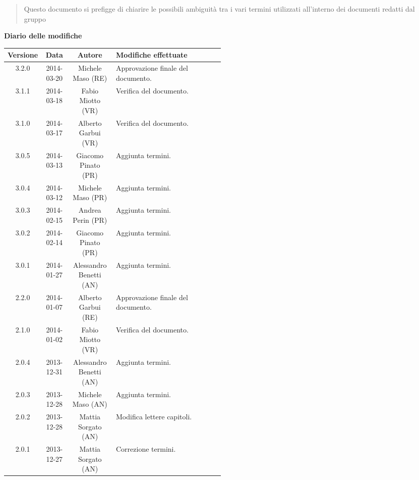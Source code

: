 \begin{abstract}
\begin{center}
Questo documento si prefigge di chiarire le possibili ambiguità tra i vari termini utilizzati all'interno dei documenti redatti dal gruppo \NomeGruppo{}
\end{center}
\end{abstract}

\newpage
\textbf{Diario delle modifiche}
\begin{center}
\begin{longtable}{|c|c|c|p{0.5\linewidth}|}
\toprule
\textbf{Versione} & \textbf{Data} & \textbf{Autore} & \textbf{Modifiche effettuate}\\

\midrule
3.2.0 & 2014-03-20 & Michele Maso (RE) & Approvazione finale del documento.\\
\midrule
3.1.1 & 2014-03-18 & Fabio Miotto (VR) & Verifica del documento. \\
\midrule
3.1.0 & 2014-03-17 & Alberto Garbui (VR) & Verifica del documento. \\
\midrule
3.0.5 & 2014-03-13 & Giacomo Pinato (PR) & Aggiunta termini.\\
\midrule
3.0.4 & 2014-03-12 & Michele Maso (PR) & Aggiunta termini.\\
\midrule
3.0.3 & 2014-02-15 & Andrea Perin (PR) & Aggiunta termini.\\
\midrule
3.0.2 & 2014-02-14 & Giacomo Pinato (PR) & Aggiunta termini.\\
\midrule
3.0.1 & 2014-01-27 & Alessandro Benetti (AN) & Aggiunta termini.\\

\midrule
2.2.0 & 2014-01-07 & Alberto Garbui (RE) & Approvazione finale del documento.\\
\midrule
2.1.0 & 2014-01-02 & Fabio Miotto (VR) & Verifica del documento.\\
\midrule
2.0.4 & 2013-12-31 & Alessandro Benetti (AN) & Aggiunta termini.\\
\midrule
2.0.3 & 2013-12-28 & Michele Maso (AN) & Aggiunta termini.\\
\midrule
2.0.2 & 2013-12-28 & Mattia Sorgato (AN) & Modifica lettere capitoli.\\
\midrule
2.0.1 & 2013-12-27 & Mattia Sorgato (AN) & Correzione termini.\\


\end{longtable}
\end{center}
